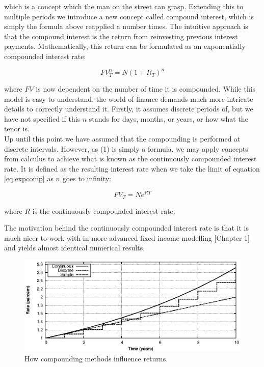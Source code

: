 which is a concept which the man on the street can grasp. Extending this to 
multiple periods we introduce a new concept called compound interest, which is 
simply the formula above reapplied a number times. The intuitive approach is
that the compound interest is the return from reinvesting previous interest 
payments. Mathematically, this return can be formulated as an exponentially 
compounded interest rate:

\begin{equation}\label{eq:expcomp}
FV_T^n = N (1 + R_T)^n
\end{equation}

where $FV$ is now dependent on the number of time it is compounded.
While this model is easy to understand, the world of finance demands much more 
intricate details to correctly understand it. Firstly, it assumes 
discrete periods of, but we have not specified if this $n$ stands for days, 
months, or years, or how what the tenor is.\\

Up until this point we have assumed that the compounding is performed at 
discrete intervals. However, as (1) is simply a formula, we may apply concepts 
from calculus to achieve what is known as the continuously compounded interest 
rate. It is defined as the resulting interest rate when we take the limit of 
equation \ref{eq:expcomp} as $n$ goes to infinity:

\begin{equation}\label{eq:expcomp}
FV_T = N e^{RT}
\end{equation}

where $R$ is the continuously compounded interest rate.

The motivation behind the continuously compounded interest rate is that it is
much nicer to work with in more advanced fixed income modelling
\cite{cmunk}[Chapter 1] and yields almost identical numerical results.\\

\begin{figure}[!htb]
\centering
\includegraphics[scale=.7]{images/comp02.eps}
\caption{How compounding methods influence returns.}
\label{fig:comp02}
\end{figure}

